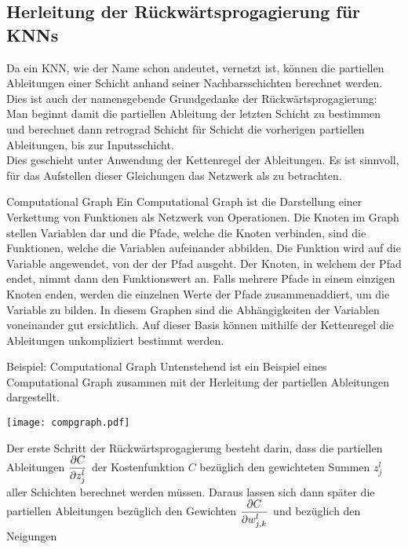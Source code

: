 \begin{appendices}
\chapter{Herleitung der Rückwärtsprogagierung für KNNs}\label{sec:anhang_bp}
Da ein KNN, wie der Name schon andeutet, vernetzt ist, können die partiellen
Ableitungen einer Schicht anhand seiner Nachbarsschichten berechnet werden.
Dies ist auch der namensgebende Grundgedanke der Rückwärtsprogagierung: Man
beginnt damit die partiellen Ableitung der letzten Schicht zu bestimmen und
berechnet dann retrograd Schicht für Schicht die vorherigen
partiellen Ableitungen, bis zur Inputsschicht. \\
Dies geschieht unter Anwendung der Kettenregel der Ableitungen.
Es ist sinnvoll, für das Aufstellen dieser Gleichungen das Netzwerk als
 zu betrachten.
\para{}
\begin{infobox}{Computational Graph}
  Ein Computational Graph ist die Darstellung einer Verkettung von Funktionen als Netzwerk von Operationen.
  Die Knoten im Graph stellen Variablen dar und die Pfade, welche die Knoten
  verbinden, sind die Funktionen, welche die Variablen aufeinander abbilden. Die
  Funktion wird auf die Variable angewendet, von der der Pfad ausgeht. Der Knoten,
  in welchem der Pfad endet, nimmt dann den Funktionswert an. Falls
  mehrere Pfade in einem einzigen Knoten enden, werden die einzelnen Werte der Pfade
  zusammenaddiert, um die Variable zu bilden. In diesem Graphen sind die
  Abhängigkeiten der Variablen voneinander gut ersichtlich. Auf dieser Basis können mithilfe
  der Kettenregel die Ableitungen unkompliziert bestimmt werden.
\end{infobox}
\para{}
\begin{examplebox}{Beispiel: Computational Graph}
  Untenstehend ist ein Beispiel eines Computational
  Graph zusammen mit der Herleitung der partiellen Ableitungen dargestellt.
  \para{}
  \begin{center}
    \texttt{[image: compgraph.pdf]}
  \end{center}
\end{examplebox}
\para{}
\pagebreak
Der erste Schritt der Rückwärtsprogagierung besteht darin, dass die partiellen Ableitungen $\displaystyle\frac{\partial C}{\partial z_j^l}$
der Kostenfunktion $C$ bezüglich den gewichteten Summen $z_j^l$ aller Schichten
berechnet werden müssen. Daraus lassen sich dann später die partiellen Ableitungen
bezüglich den Gewichten $\displaystyle\frac{\partial C}{\partial w_{j,k}^l}$ und bezüglich den Neigungen

\end{appendices}

